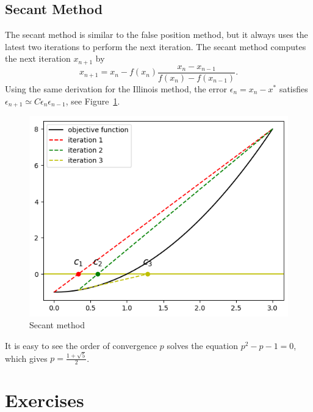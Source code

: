 \subsection{Secant Method}
\label{SSec: 0-SE-ME}
The secant method is similar to the false position method, but it always uses the latest two iterations to perform the next iteration. The secant method computes the next iteration $x_{n+1}$ by
$$
x_{n+1} = x_n - f(x_n)\frac{x_n - x_{n-1}}{f(x_n) - f(x_{n-1})}.
$$
Using the same derivation for the Illinois method, the error $\epsilon_{n} = x_n - x^{\ast}$ satisfies $\epsilon_{n+1} \simeq C \epsilon_{n}\epsilon_{n-1}$, see Figure~\ref{FIG: 0-RO-FI-SE}.
\begin{figure}[!htb]
    \centering
    \includegraphics[scale=0.6]{Figures/root_finding_img_3.png}
    \caption{Secant method}
    \label{FIG: 0-RO-FI-SE}
\end{figure}
It is easy to see the order of convergence $p$ solves the equation $p^2 - p - 1 = 0$, which gives $p = \frac{1 + \sqrt{5}}{2}$.

\section{Exercises}
